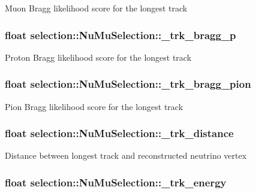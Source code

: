 Muon Bragg likelihood score for the longest track \hypertarget{classselection_1_1NuMuSelection_a14e0373dc5bdb3b21399f45b7313294c}{
\subsubsection[{\-\_\-trk\-\_\-bragg\-\_\-p}]{\setlength{\rightskip}{0pt plus 5cm}float selection\-::\-Nu\-Mu\-Selection\-::\-\_\-trk\-\_\-bragg\-\_\-p\hspace{0.3cm}{\ttfamily [private]}}}\label{classselection_1_1NuMuSelection_a14e0373dc5bdb3b21399f45b7313294c}
Proton Bragg likelihood score for the longest track \hypertarget{classselection_1_1NuMuSelection_ae68f8cd5aba5ad848ac6ef0576ce6039}{
\subsubsection[{\-\_\-trk\-\_\-bragg\-\_\-pion}]{\setlength{\rightskip}{0pt plus 5cm}float selection\-::\-Nu\-Mu\-Selection\-::\-\_\-trk\-\_\-bragg\-\_\-pion\hspace{0.3cm}{\ttfamily [private]}}}\label{classselection_1_1NuMuSelection_ae68f8cd5aba5ad848ac6ef0576ce6039}
Pion Bragg likelihood score for the longest track \hypertarget{classselection_1_1NuMuSelection_a4d2e1ceec2811a4493f964212b744e26}{
\subsubsection[{\-\_\-trk\-\_\-distance}]{\setlength{\rightskip}{0pt plus 5cm}float selection\-::\-Nu\-Mu\-Selection\-::\-\_\-trk\-\_\-distance\hspace{0.3cm}{\ttfamily [private]}}}\label{classselection_1_1NuMuSelection_a4d2e1ceec2811a4493f964212b744e26}
Distance between longest track and reconstructed neutrino vertex \hypertarget{classselection_1_1NuMuSelection_a505f81bb9d920d0304d988a2f3fadbc2}{
\subsubsection[{\-\_\-trk\-\_\-energy}]{\setlength{\rightskip}{0pt plus 5cm}float selection\-::\-Nu\-Mu\-Selection\-::\-\_\-trk\-\_\-energy\hspace{0.3cm}{\ttfamily [private]}}}\label{classselection_1_1NuMuSelection_a505f81bb9d920d0304d988a2f3fadbc2}
